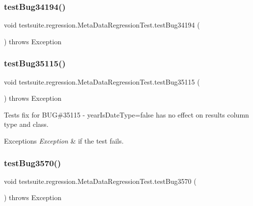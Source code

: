 \subsubsection{\texorpdfstring{test\+Bug34194()}{testBug34194()}}
{\footnotesize\ttfamily void testsuite.\+regression.\+Meta\+Data\+Regression\+Test.\+test\+Bug34194 (\begin{DoxyParamCaption}{ }\end{DoxyParamCaption}) throws Exception}

\mbox{\label{classtestsuite_1_1regression_1_1_meta_data_regression_test_a73c2bf687084e2bc8c33f56cce84bdbf}} 
\subsubsection{\texorpdfstring{test\+Bug35115()}{testBug35115()}}
{\footnotesize\ttfamily void testsuite.\+regression.\+Meta\+Data\+Regression\+Test.\+test\+Bug35115 (\begin{DoxyParamCaption}{ }\end{DoxyParamCaption}) throws Exception}

Tests fix for B\+UG\#35115 -\/ year\+Is\+Date\+Type=false has no effect on result\textquotesingle{}s column type and class.


\begin{DoxyExceptions}{Exceptions}
{\em Exception} & if the test fails. \\
\hline
\end{DoxyExceptions}
\mbox{\label{classtestsuite_1_1regression_1_1_meta_data_regression_test_a6b6d260139fb71288f93be76dac3f047}} 
\subsubsection{\texorpdfstring{test\+Bug3570()}{testBug3570()}}
{\footnotesize\ttfamily void testsuite.\+regression.\+Meta\+Data\+Regression\+Test.\+test\+Bug3570 (\begin{DoxyParamCaption}{ }\end{DoxyParamCaption}) throws Exception}

